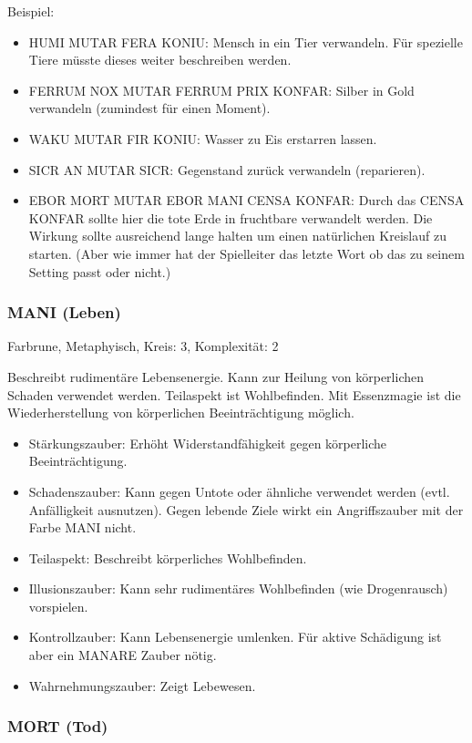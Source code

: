 \documentclass{article}
\begin{document}
Beispiel:

\begin{itemize}
\item HUMI MUTAR FERA KONIU: Mensch in ein Tier verwandeln. Für spezielle Tiere müsste dieses weiter beschreiben werden.
\item FERRUM NOX MUTAR FERRUM PRIX KONFAR: Silber in Gold verwandeln (zumindest für einen Moment).
\item WAKU MUTAR FIR KONIU: Wasser zu Eis erstarren lassen.
\item SICR AN MUTAR SICR: Gegenstand zurück verwandeln (reparieren).
\item EBOR MORT MUTAR EBOR MANI CENSA KONFAR: Durch das CENSA KONFAR sollte hier die tote Erde in fruchtbare verwandelt werden. Die Wirkung sollte ausreichend lange halten um einen natürlichen Kreislauf zu starten. (Aber wie immer hat der Spielleiter das letzte Wort ob das zu seinem Setting passt oder nicht.)
\end{itemize}

\subsubsection{MANI (Leben)}

Farbrune, Metaphyisch, Kreis: 3, Komplexität: 2

Beschreibt rudimentäre Lebensenergie. Kann zur Heilung von körperlichen Schaden verwendet werden. Teilaspekt ist
Wohlbefinden. Mit Essenzmagie ist die Wiederherstellung von körperlichen Beeinträchtigung möglich.

\begin{itemize}
\item Stärkungszauber: Erhöht Widerstandfähigkeit gegen körperliche Beeinträchtigung.
\item Schadenszauber: Kann gegen Untote oder ähnliche verwendet werden (evtl. Anfälligkeit ausnutzen). Gegen lebende Ziele wirkt ein Angriffszauber mit der Farbe MANI nicht.
\item Teilaspekt: Beschreibt körperliches Wohlbefinden.
\item Illusionszauber: Kann sehr rudimentäres Wohlbefinden (wie Drogenrausch) vorspielen.
\item Kontrollzauber: Kann Lebensenergie umlenken. Für aktive Schädigung ist aber ein MANARE Zauber nötig.
\item Wahrnehmungszauber: Zeigt Lebewesen.
\end{itemize}

\subsubsection{MORT (Tod)}
\end{document}
